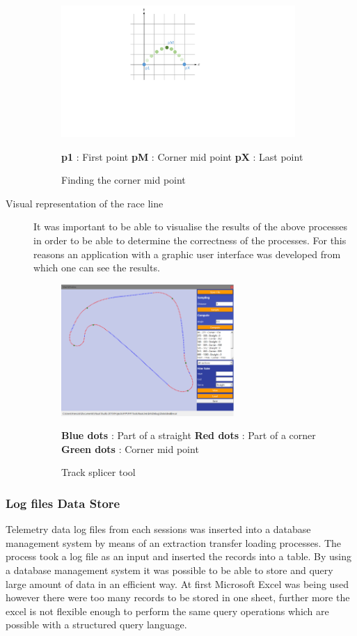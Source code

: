\begin{description}
	\begin{figure}[!htb]
		\centering
		\includegraphics[height=5cm]{diagrams/cornerMidPoint.pdf}
		\caption[Corner mid point]{Finding the corner mid point}
		\textbf{p1} : First point \textbf{pM} : Corner mid point \textbf{pX} : Last point
		\label{fig:diagram-cornerMidPoint}
	\end{figure}
	
	\item [Visual representation of the race line] It was important to be able to visualise the results of the above processes in order to be able to determine the correctness of the processes. For this reasons an application with a graphic user interface was developed from which one can see the results.
	
	\begin{figure}[!htb]
		\centering
		\includegraphics[height=5cm]{images/tracksplicertool}
		\caption{Track splicer tool}
		\textbf{Blue dots} : Part of a straight \textbf{Red dots} : Part of a corner \textbf{Green dots} : Corner mid point
		\label{fig:TrackSplicerTool}
	\end{figure}
	
\end{description}

\subsubsection{Log files Data Store}
Telemetry data log files from each sessions was inserted into a database management system by means of an extraction transfer loading processes. The process took a log file as an input and inserted the records into a table. By using a database management system it was possible to be able to store and query large amount of data in an efficient way. At first Microsoft Excel was being used however there were too many records to be stored in one sheet, further more the excel is not flexible enough to perform the same query operations which are possible with a structured query language.

